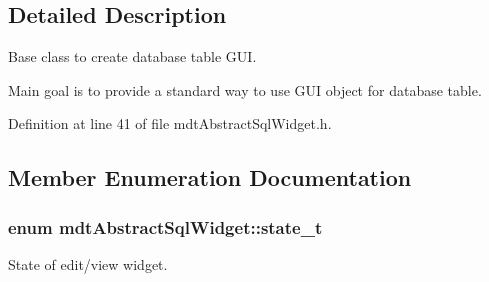 \subsection{Detailed Description}
Base class to create database table GUI. 

Main goal is to provide a standard way to use GUI object for database table. 

Definition at line 41 of file mdtAbstractSqlWidget.h.



\subsection{Member Enumeration Documentation}
\hypertarget{classmdt_abstract_sql_widget_a54e6a7f2b41fb3edfa1e4ed62abf4072}{
\subsubsection[{state\_\-t}]{\setlength{\rightskip}{0pt plus 5cm}enum {\bf mdtAbstractSqlWidget::state\_\-t}}}
\label{classmdt_abstract_sql_widget_a54e6a7f2b41fb3edfa1e4ed62abf4072}


State of edit/view widget. 

